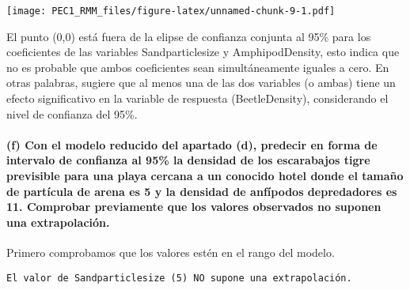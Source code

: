 \documentclass[
]{article}
\begin{document}
\texttt{[image: PEC1\_RMM\_files/figure-latex/unnamed-chunk-9-1.pdf]}

El punto (0,0) está fuera de la elipse de confianza conjunta al 95\%
para los coeficientes de las variables Sandparticlesize y
AmphipodDensity, esto indica que no es probable que ambos coeficientes
sean simultáneamente iguales a cero. En otras palabras, sugiere que al
menos una de las dos variables (o ambas) tiene un efecto significativo
en la variable de respuesta (BeetleDensity), considerando el nivel de
confianza del 95\%.

\hypertarget{f-con-el-modelo-reducido-del-apartado-d-predecir-en-forma-de-intervalo-de-confianza-al-95-la-densidad-de-los-escarabajos-tigre-previsible-para-una-playa-cercana-a-un-conocido-hotel-donde-el-tamauxf1o-de-partuxedcula-de-arena-es-5-y-la-densidad-de-anfuxedpodos-depredadores-es-11.-comprobar-previamente-que-los-valores-observados-no-suponen-una-extrapolaciuxf3n.}{%
\paragraph{\texorpdfstring{\textbf{(f) Con el modelo reducido del
apartado (d), predecir en forma de intervalo de confianza al 95\% la
densidad de los escarabajos tigre previsible para una playa cercana a un
conocido hotel donde el tamaño de partícula de arena es 5 y la densidad
de anfípodos depredadores es 11. Comprobar previamente que los valores
observados no suponen una
extrapolación.}}{(f) Con el modelo reducido del apartado (d), predecir en forma de intervalo de confianza al 95\% la densidad de los escarabajos tigre previsible para una playa cercana a un conocido hotel donde el tamaño de partícula de arena es 5 y la densidad de anfípodos depredadores es 11. Comprobar previamente que los valores observados no suponen una extrapolación.}}\label{f-con-el-modelo-reducido-del-apartado-d-predecir-en-forma-de-intervalo-de-confianza-al-95-la-densidad-de-los-escarabajos-tigre-previsible-para-una-playa-cercana-a-un-conocido-hotel-donde-el-tamauxf1o-de-partuxedcula-de-arena-es-5-y-la-densidad-de-anfuxedpodos-depredadores-es-11.-comprobar-previamente-que-los-valores-observados-no-suponen-una-extrapolaciuxf3n.}}

Primero comprobamos que los valores estén en el rango del modelo.

\begin{verbatim}
El valor de Sandparticlesize (5) NO supone una extrapolación.
\end{verbatim}
\end{document}

